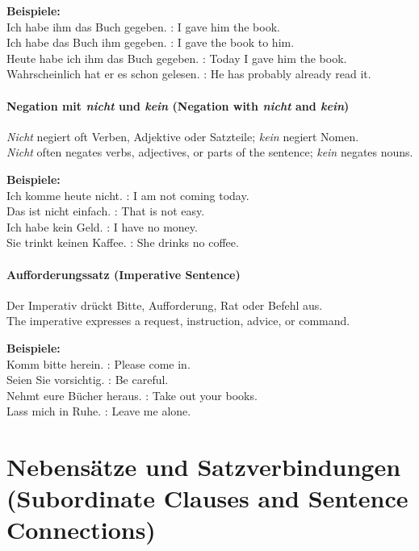 \documentclass[a4paper]{article}
\begin{document}
            \textbf{Beispiele:}\\
            Ich habe ihm das Buch gegeben. : I gave him the book.\\
            Ich habe das Buch ihm gegeben. : I gave the book to him.\\
            Heute habe ich ihm das Buch gegeben. : Today I gave him the book.\\
            Wahrscheinlich hat er es schon gelesen. : He has probably already read it.
        
        \paragraph{Negation mit \textit{nicht} und \textit{kein} {\small (Negation with \textit{nicht} and \textit{kein})}}
            \textit{Nicht} negiert oft Verben, Adjektive oder Satzteile; \textit{kein} negiert Nomen.\\
            \textit{Nicht} often negates verbs, adjectives, or parts of the sentence; \textit{kein} negates nouns.
            
            \textbf{Beispiele:}\\
            Ich komme heute nicht. : I am not coming today.\\
            Das ist nicht einfach. : That is not easy.\\
            Ich habe kein Geld. : I have no money.\\
            Sie trinkt keinen Kaffee. : She drinks no coffee.
        
        \paragraph{Aufforderungssatz {\small (Imperative Sentence)}}
            Der Imperativ drückt Bitte, Aufforderung, Rat oder Befehl aus.\\
            The imperative expresses a request, instruction, advice, or command.
            
            \textbf{Beispiele:}\\
            Komm bitte herein. : Please come in.\\
            Seien Sie vorsichtig. : Be careful.\\
            Nehmt eure Bücher heraus. : Take out your books.\\
            Lass mich in Ruhe. : Leave me alone.
    
    
    \section{Nebensätze und Satzverbindungen {\small (Subordinate Clauses and Sentence Connections)}}
    
\end{document}
